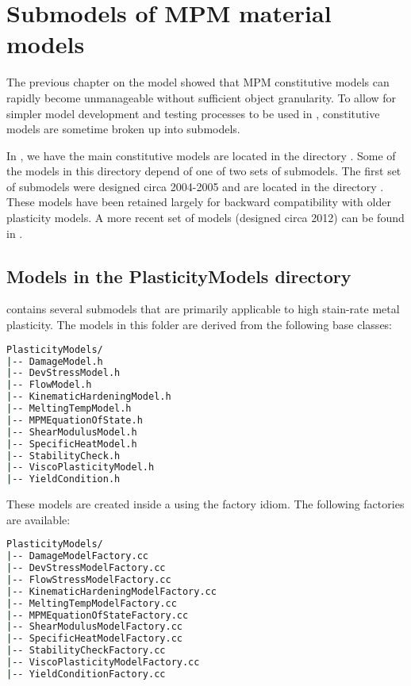 \chapter{Submodels of MPM material models}
The previous chapter on the \Arena model showed that MPM constitutive models can
rapidly become unmanageable without sufficient object granularity.  To allow
for simpler model development and testing processes to be used in \Vaango, 
constitutive models are sometime broken up into submodels.

In \Vaango, we have the main constitutive models are located in the directory
.  Some of the models in
this directory depend of one of two sets of submodels.  The first set of 
submodels were designed circa 2004-2005 and are located in the directory
.  These models have been 
retained largely for backward compatibility with older plasticity models.
A more recent set of models (designed circa 2012) can be found in 
.

\section{Models in the PlasticityModels directory}
 contains several submodels that
are primarily applicable to high stain-rate metal plasticity.  The
models in this folder are derived from the following base classes:
\begin{lstlisting}[language=sh, backgroundcolor=\color{background}]
PlasticityModels/
|-- DamageModel.h
|-- DevStressModel.h
|-- FlowModel.h
|-- KinematicHardeningModel.h
|-- MeltingTempModel.h
|-- MPMEquationOfState.h
|-- ShearModulusModel.h
|-- SpecificHeatModel.h
|-- StabilityCheck.h
|-- ViscoPlasticityModel.h
|-- YieldCondition.h
\end{lstlisting}

These models are created inside a  using the 
factory idiom.  The following factories are available:
\begin{lstlisting}[language=sh, backgroundcolor=\color{background}]
PlasticityModels/
|-- DamageModelFactory.cc
|-- DevStressModelFactory.cc
|-- FlowStressModelFactory.cc
|-- KinematicHardeningModelFactory.cc
|-- MeltingTempModelFactory.cc
|-- MPMEquationOfStateFactory.cc
|-- ShearModulusModelFactory.cc
|-- SpecificHeatModelFactory.cc
|-- StabilityCheckFactory.cc
|-- ViscoPlasticityModelFactory.cc
|-- YieldConditionFactory.cc
\end{lstlisting}

